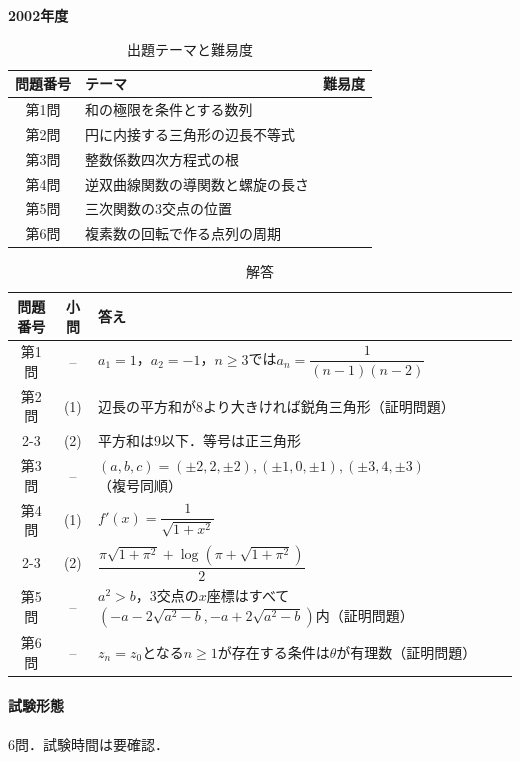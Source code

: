 \documentclass[../../main.tex]{subfiles}
\begin{document}
\begin{center}
  {\fontsize{48pt}{58pt}\selectfont \textbf{2002}\normalsize\textbf{年度}}
\end{center}

\begin{table}[htb]
  \centering
  \caption{出題テーマと難易度}
  \begin{tabular}{|c|p{9cm}|c|}
    \hline
    \textbf{問題番号} & \textbf{テーマ} & \textbf{難易度} \\
    \hline
    第1問 & 和の極限を条件とする数列 & \\
    \hline
    第2問 & 円に内接する三角形の辺長不等式 & \\
    \hline
    第3問 & 整数係数四次方程式の根 & \\
    \hline
    第4問 & 逆双曲線関数の導関数と螺旋の長さ & \\
    \hline
    第5問 & 三次関数の3交点の位置 & \\
    \hline
    第6問 & 複素数の回転で作る点列の周期 & \\
    \hline
  \end{tabular}
\end{table}

\begin{table}[htb]
  \centering
  \caption{解答}
  \renewcommand{\arraystretch}{1.4}
  \begin{tabular}{|c|c|p{9cm}|}
    \hline
    \textbf{問題番号} & \textbf{小問} & \textbf{答え} \\
    \hline
    第1問 & -- & $a_1=1$，$a_2=-1$，$n\ge3$では$a_n=\dfrac{1}{(n-1)(n-2)}$ \\
    \hline
    第2問 & (1) & 辺長の平方和が$8$より大きければ鋭角三角形（証明問題） \\
    \cline{2-3}
    & (2) & 平方和は$9$以下．等号は正三角形 \\
    \hline
    第3問 & -- & $(a,b,c)=(\pm2,2,\pm2),(\pm1,0,\pm1),(\pm3,4,\pm3)$（複号同順） \\
    \hline
    第4問 & (1) & $f'(x)=\dfrac{1}{\sqrt{1+x^2}}$ \\
    \cline{2-3}
    & (2) & $\dfrac{\pi\sqrt{1+\pi^2}+\log(\pi+\sqrt{1+\pi^2})}{2}$ \\
    \hline
    第5問 & -- & $a^2>b$，3交点の$x$座標はすべて$(-a-2\sqrt{a^2-b},-a+2\sqrt{a^2-b})$内（証明問題） \\
    \hline
    第6問 & -- & $z_n=z_0$となる$n\ge1$が存在する条件は$\theta$が有理数（証明問題） \\
    \hline
  \end{tabular}
\end{table}

\paragraph{試験形態}
6問．試験時間は要確認．
\end{document}
